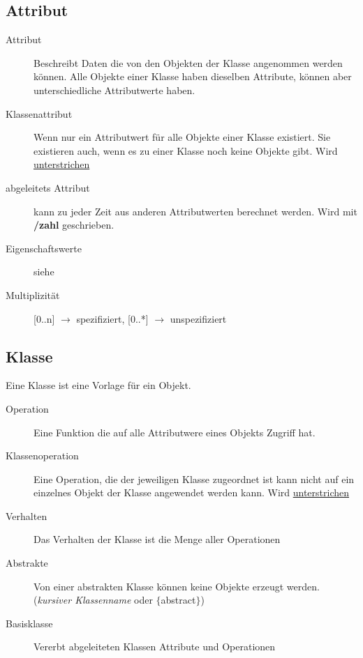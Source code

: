 \subsection{Attribut }
  \begin{description}
    \item[Attribut] 
      Beschreibt Daten die von den Objekten der Klasse angenommen
      werden können. Alle Objekte einer Klasse haben dieselben Attribute, können
      aber unterschiedliche Attributwerte haben.
    \item[Klassenattribut] 
      Wenn nur ein Attributwert für alle Objekte einer Klasse existiert. 
      Sie existieren auch, wenn es zu einer Klasse noch keine Objekte gibt.
      Wird \underline{unterstrichen}
    \item[abgeleitets Attribut]
      kann zu jeder Zeit aus anderen Attributwerten berechnet werden. Wird mit \textbf{/zahl} geschrieben.  
    \item[Eigenschaftswerte]
      siehe       
    \item[Multiplizität]
      [0..n] $\rightarrow$ spezifiziert, [0..*] $\rightarrow$ unspezifiziert
  \end{description}
  
\subsection{Klasse }
  Eine Klasse ist eine Vorlage für ein Objekt.
  \begin{description}
    \item[Operation] 
      Eine Funktion die auf alle Attributwere eines Objekts Zugriff hat.
    \item[Klassenoperation] 
      Eine Operation, die der jeweiligen Klasse zugeordnet ist kann nicht auf 
      ein einzelnes Objekt der Klasse angewendet werden kann. Wird \underline{unterstrichen}
    \item[Verhalten] 
      Das Verhalten der Klasse ist die Menge aller Operationen
    \item[Abstrakte] 
      Von einer abstrakten Klasse können keine Objekte erzeugt werden. 
      (\textit{kursiver Klassenname} oder $\lbrace$abstract$\rbrace$)
    \item[Basisklasse] 
      Vererbt abgeleiteten Klassen Attribute und Operationen
  \end{description}
  

